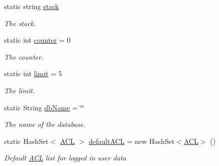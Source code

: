 \begin{DoxyCompactItemize}
static string \hyperlink{classcom_1_1shephertz_1_1app42_1_1paas_1_1sdk_1_1csharp_1_1_app42_a_p_i_ad4f3558e2a49b870cf926524f8c39fa0}{stack}
\begin{DoxyCompactList}\small\item\em The stack. \end{DoxyCompactList}\item 
static int \hyperlink{classcom_1_1shephertz_1_1app42_1_1paas_1_1sdk_1_1csharp_1_1_app42_a_p_i_afa8ca1b8139f2d2ac7f8c2266c7a440a}{counter} = 0
\begin{DoxyCompactList}\small\item\em The counter. \end{DoxyCompactList}\item 
static int \hyperlink{classcom_1_1shephertz_1_1app42_1_1paas_1_1sdk_1_1csharp_1_1_app42_a_p_i_a028f8a7c304daf41aaed19b0b77031a1}{limit} = 5
\begin{DoxyCompactList}\small\item\em The limit. \end{DoxyCompactList}\item 
static String \hyperlink{classcom_1_1shephertz_1_1app42_1_1paas_1_1sdk_1_1csharp_1_1_app42_a_p_i_afd376bb446a8f89b77f9afbd55c6fac9}{db\+Name} = \char`\"{}\char`\"{}
\begin{DoxyCompactList}\small\item\em The name of the database. \end{DoxyCompactList}\item 
static Hash\+Set$<$ \hyperlink{classcom_1_1shephertz_1_1app42_1_1paas_1_1sdk_1_1csharp_1_1_a_c_l}{A\+C\+L} $>$ \hyperlink{classcom_1_1shephertz_1_1app42_1_1paas_1_1sdk_1_1csharp_1_1_app42_a_p_i_a8ccfacd2b83f6020e0bfda37a46c8bfd}{default\+A\+C\+L} = new Hash\+Set$<$\hyperlink{classcom_1_1shephertz_1_1app42_1_1paas_1_1sdk_1_1csharp_1_1_a_c_l}{A\+C\+L}$>$ ()
\begin{DoxyCompactList}\small\item\em Default \hyperlink{classcom_1_1shephertz_1_1app42_1_1paas_1_1sdk_1_1csharp_1_1_a_c_l}{A\+C\+L} list for logged in user data \end{DoxyCompactList}\end{DoxyCompactItemize}


